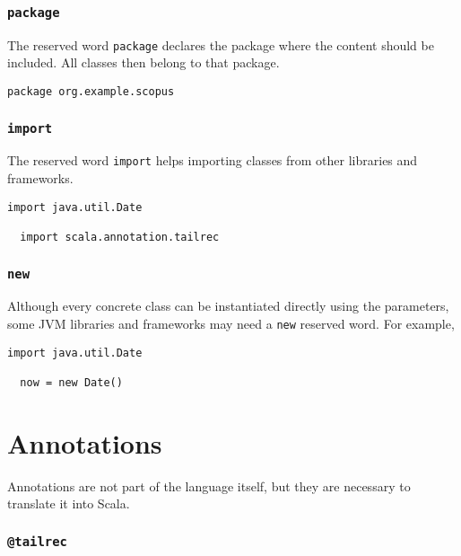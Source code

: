 \documentclass[12pt,a4paper]{book}
\makeatletter
\newcommand{\srccode}[1]{\texttt{{#1}}}
\newcommand{\reservedWord}[1]{{\color{blue}\srccode{#1}}\xspace}
\newcommand{\annotation}[1]{{\color{brown}\srccode{#1}}\xspace}
\newcommand{\spackage}{\reservedWord{package}}
\newcommand{\simport}{\reservedWord{import}}
\newcommand{\snew}{\reservedWord{new}}
\newcommand{\stailrec}{\annotation{@tailrec}}
\makeatother
\begin{document}
    \subsubsection{\spackage}

    The reserved word \spackage declares the package where the content should be included.
    All classes then belong to that package.

    \begin{lstlisting}[label={lst:examplePackage}]
  package org.example.scopus
    \end{lstlisting}

    \subsubsection{\simport}

    The reserved word \simport helps importing classes from other libraries and frameworks.

    \begin{lstlisting}[label={lst:exampleImport}]
  import java.util.Date

  import scala.annotation.tailrec
    \end{lstlisting}

    \subsubsection{\snew}

    Although every concrete class can be instantiated directly using the parameters, some JVM libraries and frameworks may need a \snew reserved word.
    For example,

    \begin{lstlisting}[label={lst:exampleImportDate}]
  import java.util.Date

  now = new Date()
    \end{lstlisting}


    \section{Annotations}

    Annotations are not part of the language itself, but they are necessary to translate it into Scala.

    \subsubsection{\stailrec}
\end{document}
